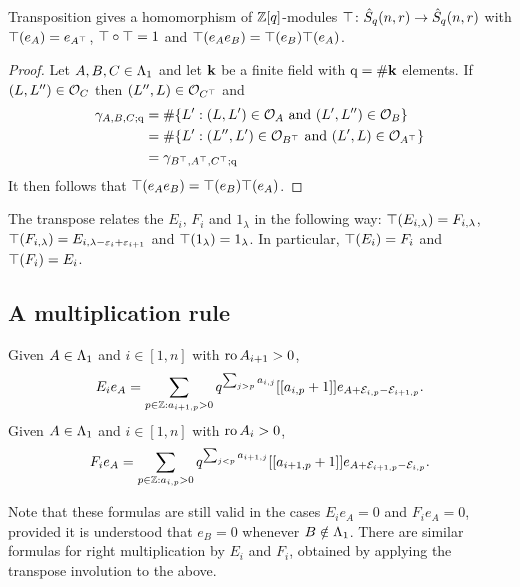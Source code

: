 \documentclass[a4paper, 11pt]{report}
\begin{document}
\begin{lemma}\label{lemma:transpose-involution}
Transposition gives a homomorphism of $\mathbb{Z}[q]$-modules $\top\colon\hat{S}_q(n,r)\to\hat{S}_q(n,r)$ with $\top(e_A) = e_{A^\top}$, $\top\circ\top = 1$ and $\top(e_A e_B) = \top(e_B)\top(e_A)$.
\end{lemma}
\begin{proof}
Let $A,B,C\in{\Lambda_1}$ and let $\mathbf{k}$ be a finite field with $\mathrm{q}=\#\mathbf{k}$ elements. If $(L,L'')\in\mathcal{O}_{C}$ then $(L'',L)\in\mathcal{O}_{C^\top}$ and
\begin{align*}
\gamma_{A,B,C;\mathrm{q}}
&= \#\{L': (L,L')\in\mathcal{O}_{A}\text{ and } (L',L'')\in\mathcal{O}_{B}\}\\
&= \#\{L': (L'',L')\in\mathcal{O}_{B^\top}\text{ and } (L',L)\in\mathcal{O}_{A^\top}\}\\
&= \gamma_{B^\top,A^\top, C^\top;\mathrm{q}}
\end{align*}
It then follows that $\top(e_A e_B) = \top(e_B) \top(e_A)$.
\end{proof}

The transpose relates the $E_i$, $F_i$ and $1_\lambda$ in the following way: $\top(E_{i,\lambda}) = F_{i,\lambda}$, $\top(F_{i,\lambda}) = E_{i,\lambda -\varepsilon_i +\varepsilon_{i+1}}$ and $\top(1_\lambda) = 1_\lambda$. In particular, $\top(E_i) = F_i$ and $\top(F_i) = E_i$.

\subsection{A multiplication rule}

\begin{lemma}\label{lemma:fundamental-multiplication-rules}
Given $A\in{\Lambda_1}$ and $i\in[1,n]$ with $\operatorname{ro}{A}_{i+1}>0$,
\begin{equation*}
E_ie_A = \sum_{p\in\mathbb{Z}:a_{i+1,p}>0} q^{\sum_{j>p}a_{i,j}} [[a_{i,p}+1]] e_{A+\mathcal{E}_{i,p} -\mathcal{E}_{i+1,p}}.
\end{equation*}
Given $A\in{\Lambda_1}$ and $i\in[1,n]$ with $\operatorname{ro}{A}_i>0$,
\begin{equation*}
F_ie_A = \sum_{p\in\mathbb{Z}:a_{i,p}>0} q^{\sum_{j<p}a_{i+1,j}} [[a_{i+1,p}+1]] e_{A+\mathcal{E}_{i+1,p} -\mathcal{E}_{i,p}}.
\end{equation*}
\end{lemma}

Note that these formulas are still valid in the cases $E_ie_A=0$ and $F_ie_A=0$, provided it is understood that $e_B = 0$ whenever $B\notin{\Lambda_1}$. There are similar formulas for right multiplication by $E_i$ and $F_i$, obtained by applying the transpose involution to the above.
\end{document}
